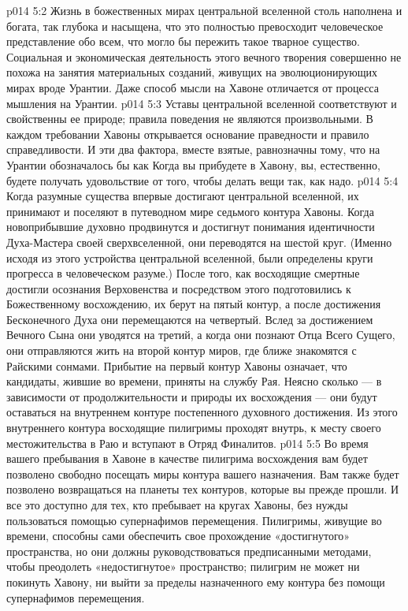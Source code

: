 \vs p014 5:2 Жизнь в божественных мирах центральной вселенной столь наполнена и богата, так глубока и насыщена, что это полностью превосходит человеческое представление обо всем, что могло бы пережить такое тварное существо. Социальная и экономическая деятельность этого вечного творения совершенно не похожа на занятия материальных созданий, живущих на эволюционирующих мирах вроде Урантии. Даже способ мысли на Хавоне отличается от процесса мышления на Урантии.
\vs p014 5:3 Уставы центральной вселенной соответствуют и свойственны ее природе; правила поведения не являются произвольными. В каждом требовании Хавоны открывается основание праведности и правило справедливости. И эти два фактора, вместе взятые, равнозначны тому, что на Урантии обозначалось бы как  Когда вы прибудете в Хавону, вы, естественно, будете получать удовольствие от того, чтобы делать вещи так, как надо.
\vs p014 5:4 \pc Когда разумные существа впервые достигают центральной вселенной, их принимают и поселяют в путеводном мире седьмого контура Хавоны. Когда новоприбывшие духовно продвинутся и достигнут понимания идентичности Духа\hyp{}Мастера своей сверхвселенной, они переводятся на шестой круг. (Именно исходя из этого устройства центральной вселенной, были определены круги прогресса в человеческом разуме.) После того, как восходящие смертные достигли осознания Верховенства и посредством этого подготовились к Божественному восхождению, их берут на пятый контур, а после достижения Бесконечного Духа они перемещаются на четвертый. Вслед за достижением Вечного Сына они уводятся на третий, а когда они познают Отца Всего Сущего, они отправляются жить на второй контур миров, где ближе знакомятся с Райскими сонмами. Прибытие на первый контур Хавоны означает, что кандидаты, жившие во времени, приняты на службу Рая. Неясно сколько --- в зависимости от продолжительности и природы их восхождения --- они будут оставаться на внутреннем контуре постепенного духовного достижения. Из этого внутреннего контура восходящие пилигримы проходят внутрь, к месту своего местожительства в Раю и вступают в Отряд Финалитов.
\vs p014 5:5 Во время вашего пребывания в Хавоне в качестве пилигрима восхождения вам будет позволено свободно посещать миры контура вашего назначения. Вам также будет позволено возвращаться на планеты тех контуров, которые вы прежде прошли. И все это доступно для тех, кто пребывает на кругах Хавоны, без нужды пользоваться помощью супернафимов перемещения. Пилигримы, живущие во времени, способны сами обеспечить свое прохождение «достигнутого» пространства, но они должны руководствоваться предписанными методами, чтобы преодолеть «недостигнутое» пространство; пилигрим не может ни покинуть Хавону, ни выйти за пределы назначенного ему контура без помощи супернафимов перемещения.
